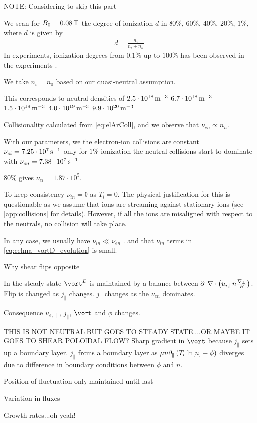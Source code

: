 NOTE: Considering to skip this part

We scan for $B_0=0.08\, \text{T}$ the degree of ionization $d$ in $80\%$, $60\%$, $40\%$, $20\%$, $1\%$, where $d$ is given by
%
\begin{align*}
    d = \frac{n_i}{n_i+n_n}
\end{align*}
%
In experiments, ionization degrees from $0.1\%$ up to $100\%$ has been observed in the experiments \cite{Schroder2003Phd}.

We take $n_i=n_0$ based on our quasi-neutral assumption.


This corresponds to neutral densities of
$2.5\cdot10^{18}\, \text{m}^{-3}$
$6.7\cdot10^{18}\, \text{m}^{-3}$
$1.5\cdot10^{19}\, \text{m}^{-3}$
$4.0\cdot10^{19}\, \text{m}^{-3}$
$9.9\cdot10^{20}\, \text{m}^{-3}$




Collisionality calculated from \cref{eq:elArColl}, and we observe that $\nu_{en}\propto n_n$.

With our parameters, we the electron-ion collisions are constant $\nu_{ei}=7.25\cdot10^7 \, \text{s}^{-1}$
only for $1\%$ ionization the neutral collisions start to dominate with $\nu_{en}=7.38\cdot10^7\, \text{s}^{-1}$

$80\%$ gives $\nu_{ei}=1.87\cdot10^{5}$.


To keep consistency $\nu_{in}=0$ as $T_i=0$.
The physical justification for this is questionable as we assume that ions are streaming against stationary ions (see \cref{app:collisions} for details).
However, if all the ions are misaligned with respect to the neutrals, no collision will take place.

In any case, we usually have $\nu_{in}\ll\nu_{en}$ \cite{Schroder2003Phd}.
and that $\nu_{in}$ terms in \cref{eq:celma_vortD_evolution} is small.


Why shear flips opposite


In the steady state $\vort^D$ is maintained by a balance between $\partial_\|\nabla\cdot\left(u_{i,\|}n\frac{\nabla_\perp}{B}\right)$.
Flip is changed as $j_\|$ changes.
$j_\|$ changes as the $\nu_{en}$ dominates.

Consequence $u_{e,\|}$, $j_\|$, $\vort$ and $\phi$ changes.





THIS IS NOT NEUTRAL BUT GOES TO STEADY STATE....OR MAYBE IT GOES TO SHEAR POLOIDAL FLOW?
Sharp gradient in $\vort$ because $j_\|$ sets up a boundary layer.
$j_\|$ froms a boundary layer as $\mu n \partial_\|\left(T_e\ln[n]-\phi\right)$ diverges due to difference in boundary conditions between $\phi$ and $n$.


Position of fluctuation only maintained until last

Variation in fluxes


Growth rates...oh yeah!
